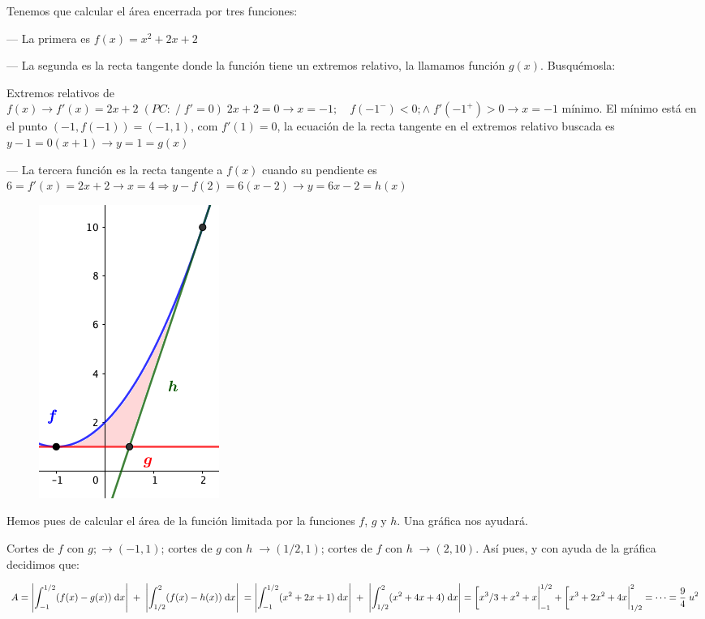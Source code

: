 \begin{proofw}\renewcommand{\qedsymbol}{$\diamond$}	

Tenemos que calcular el área encerrada por tres funciones:

--- La primera es $f(x)=x^2+2x+2$

--- La segunda es la recta tangente donde la función tiene un extremos relativo, la llamamos función $g(x)$. Busquémosla:
\begin{multicols}{2}

Extremos relativos de $f(x)\to f'(x)=2x+2\; (PC: \; / \; f'=0) \; 2x+2=0 \to x=-1	; \quad f(-1^-)<0; \wedge \; f'(-1^+)>0 \to x=-1 \text { mínimo}$. El mínimo está en el punto $(-1,f(-1))=(-1, 1)$, com $f'(1)=0$, la ecuación de la recta tangente en el extremos relativo buscada es $y-1=0(x+1)\to y=1=g(x)$

--- La tercera función es la recta tangente a $f(x)$ cuando su pendiente es $6=f'(x)=2x+2 \to x=4 \Rightarrow y-f(2)=6(x-2) \to y=6x-2=h(x)$

	\begin{figure}[H]
		\centering
		\includegraphics[width=.30\textwidth]{imagenes/imagenes08/T08IM28.png}
	\end{figure}
\end{multicols}

Hemos pues de calcular el área de la función limitada por la funciones $f$, $g$ y $h$. Una gráfica nos ayudará.

Cortes de $f$ con $g; \to (-1,1)$; cortes de $g$ con $h\;  \to (1/2,1)$; cortes de  $f$ con $h\; \to (2,10)$. Así pues, y con ayuda de la gráfica decidimos que:

$A=\displaystyle \left| \int_{-1}^{1/2} (f(x)-g(x))\; \dd x \right| \; + \; \left| \int_{1/2}^{2} (f(x)-h(x))\; \dd x \right| \; = \left| \int_{-1}^{1/2} (x^2+2x+1) \; \dd x \right| \; + \; \left| \int_{1/2}^{2} (x^2+4x+4) \; \dd x \right| = \eval[x^3/3+x^2+x|_{-1}^{1/2} + \eval[x^3+2x^2+4x|_{1/2}^{2}=\cdots= \frac 9 4 \; u^2$

\end{proofw}

